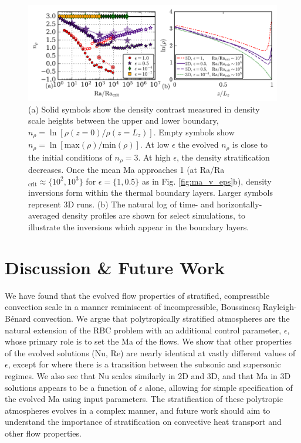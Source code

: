 \documentclass[aps, pre, onecolumn, nofootinbib, notitlepage, groupedaddress, amsfonts, amssymb, amsmath, longbibliography]{revtex4-1}
\newcommand{\RB}{Rayleigh-B\'{e}nard }
\begin{document}
\begin{figure}[t!]
\includegraphics[width=\textwidth]{./figs/density_v_ra.png}
\caption{\label{fig:nrho_v_ra} 
(a) Solid symbols show the density contrast measured
in density scale heights between the upper and lower boundary, 
$n_\rho = \ln[\rho(z=0)/\rho(z=L_z)]$.
Empty symbols show 
$n_\rho = \ln[\text{max}(\rho)/\text{min}(\rho)]$. 
At low $\epsilon$ the evolved
$n_{\rho}$ is close to the initial conditions of $n_\rho = 3$.  
At high $\epsilon$,
the density stratification decreases.  Once the mean 
Ma approaches 1 (at Ra/Ra$_{\text{crit}} \approx \{10^2, 10^3\}$ for $\epsilon = \{1, 0.5\}$
as in Fig. \ref{fig:ma_v_eps}b), density inversions form within the thermal
boundary layers. Larger symbols represent 3D runs. (b) The natural log of time-
and horizontally-averaged density profiles are shown for select simulations,
to illustrate the inversions which appear in the boundary layers.}
\end{figure}

\vspace{-0.5cm}
\section{Discussion \& Future Work}
We have found that the evolved flow properties of stratified,
compressible convection scale in a manner reminiscent of incompressible,
Boussinesq \RB convection.
We argue that polytropically stratified atmospheres are the natural
extension of the RBC problem with an additional control parameter, $\epsilon$,
whose primary role is to set the Ma of the flows.  We show that other properties
of the evolved solutions (Nu, Re) are nearly identical at vastly different values
of $\epsilon$, except for where there is a transition between the subsonic
and supersonic regimes.  We also see that Nu scales similarly in 2D and 3D,
and that Ma in 3D solutions appears to be a function of $\epsilon$ alone,
allowing for simple specification of the evolved Ma using input parameters.
The stratification of 
these polytropic atmospheres evolves in a complex
manner, and future work should aim to 
understand the importance of stratification on
convective heat transport and other flow properties.
\end{document}

